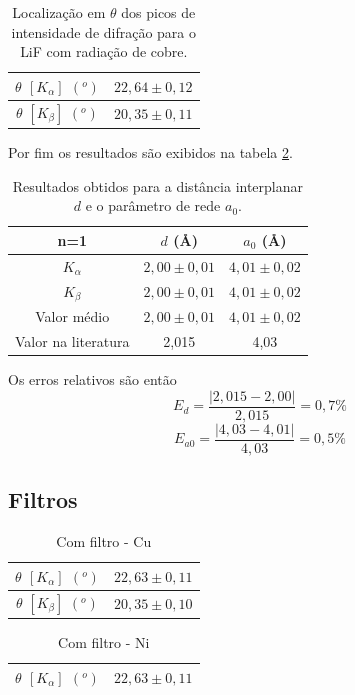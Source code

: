 \documentclass[article,12pt,openright,oneside,a4paper,brazil]{abntex2}
\begin{document}
\begin{table}[H]
    \centering
    \caption{Localização em $\theta$ dos picos de intensidade de difração para o LiF com radiação de cobre.}
    \begin{tabular}{|c|c|}
        \hline
        $\theta$ $[K_\alpha]$ $(^o)$ & $22,64\pm0,12$ \\ \hline
        $\theta$ $[K_\beta]$ $(^o)$ & $20,35\pm0,11$ \\ \hline
    \end{tabular}
    \label{tab:dLiF}
\end{table}

Por fim os resultados são exibidos na tabela \ref{tab:LiF}.

\begin{table}[H]
    \centering
    \caption{Resultados obtidos para a distância interplanar $d$ e o parâmetro de rede $a_0$.}
    \begin{tabular}{|c|c|c|}
        \hline
        n=1 & $d$ (\r{A}) & $a_0$ (\r{A}) \\ \hline
        $K_\alpha$ & $2,00\pm0,01$ & $4,01\pm0,02$ \\ \hline
        $K_\beta$ & $2,00\pm0,01$ & $4,01\pm0,02$ \\ \hline
        Valor médio & $2,00\pm0,01$ & $4,01\pm0,02$ \\ \hline
        Valor na literatura & 2,015 & 4,03 \\ \hline
    \end{tabular}
    \label{tab:LiF}
\end{table}

Os erros relativos são então
$$E_d=\frac{|2,015-2,00|}{2,015}=0,7\%$$
$$E_{a0}=\frac{|4,03-4,01|}{4,03}=0,5\%$$

\subsection{Filtros}

\begin{table}[H]
    \centering
    \begin{tabular}{|c|c|}
        \hline
        $\theta$ $[K_\alpha]$ $(^o)$ & $22,63\pm0,11$ \\ \hline
        $\theta$ $[K_\beta]$ $(^o)$ & $20,35\pm0,10$ \\ \hline
    \end{tabular}
    \caption{Com filtro - Cu}
    \label{tab:my_label4}
\end{table}

\begin{table}[H]
    \centering
    \begin{tabular}{|c|c|}
        \hline
        $\theta$ $[K_\alpha]$ $(^o)$ & $22,63\pm0,11$ \\ \hline
    \end{tabular}
    \caption{Com filtro - Ni}
    \label{tab:my_label5}
\end{table}
\end{document}
